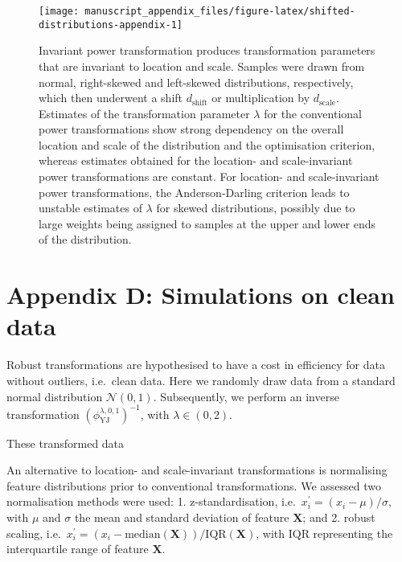 \documentclass[
  a4paper,
]{article}
\begin{document}
\begin{figure}

{\centering \texttt{[image: manuscript\_appendix\_files/figure-latex/shifted-distributions-appendix-1]} 

}

\caption{Invariant power transformation produces transformation parameters that are invariant to location and scale. Samples were drawn from normal, right-skewed and left-skewed distributions, respectively, which then underwent a shift $d_{\text{shift}}$ or multiplication by $d_{\text{scale}}$. Estimates of the transformation parameter $\lambda$ for the conventional power transformations show strong dependency on the overall location and scale of the distribution and the optimisation criterion, whereas estimates obtained for the location- and scale-invariant power transformations are constant. For location- and scale-invariant power transformations, the Anderson-Darling criterion leads to unstable estimates of $\lambda$ for skewed distributions, possibly due to large weights being assigned to samples at the upper and lower ends of the distribution.}\label{fig:shifted-distributions-appendix}
\end{figure}

\section{Appendix D: Simulations on clean
data}\label{appendix-d-simulations-on-clean-data}

Robust transformations are hypothesised to have a cost in efficiency for
data without outliers, i.e.~clean data. Here we randomly draw data from
a standard normal distribution \(\mathcal{N}(0,1)\). Subsequently, we
perform an inverse transformation
\(\left(\phi_{\text{YJ}}^{\lambda, 0, 1}\right)^{-1}\), with
\(\lambda \in \left(0, 2\right)\).

These transformed data

An alternative to location- and scale-invariant transformations is
normalising feature distributions prior to conventional transformations.
We assessed two normalisation methods were used: 1. z-standardisation,
i.e.~\(x^{\prime}_{i} = \left(x_i - \mu \right) / \sigma\), with \(\mu\)
and \(\sigma\) the mean and standard deviation of feature
\(\mathbf{X}\); and 2. robust scaling,
i.e.~\(x^{\prime}_{i} = \left(x_i - \text{median}\left(\mathbf{X}\right) \right) / \text{IQR}\left(\mathbf{X}\right)\),
with \(\text{IQR}\) representing the interquartile range of feature
\(\mathbf{X}\).
\end{document}
